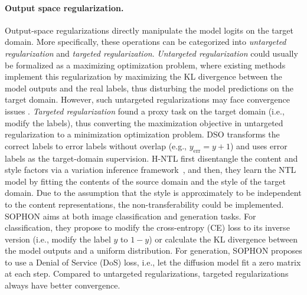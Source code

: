 \paragraph{Output space regularization.} Output-space regularizations directly manipulate the model logits on the target domain. More specifically, these operations can be categorized into \textit{untargeted regularization} and \textit{targeted regularization}. \textit{Untargeted regularization} \cite{wang2021non,wang2023model,zhou2024archlock,peng2024map} could usually be formalized as a maximizing optimization problem, where existing methods implement this regularization by maximizing the KL divergence between the model outputs and the real labels, thus disturbing the model predictions on the target domain. However, such untargeted regularizations may face convergence issues \cite{deng2024sophon}. \textit{Targeted regularization} \cite{wang2023domain,deng2024sophon} found a proxy task on the target domain (i.e., modify the labels), thus converting the maximization objective in untargeted regularization to a minimization optimization problem. 
DSO \cite{wang2023domain} transforms the correct labels to error labels without overlap (e.g., $y_{\text{err}} = y+1$) and uses error labels as the target-domain supervision. 
H-NTL \cite{hong2024improving} first disentangle the content and style factors via a variation inference framework~\cite{blei2017variational,yao2021instance,von2021self,lin2024cs,lin2025learning}, and then, they learn the NTL model by fitting the contents of the source domain and the style of the target domain. Due to the assumption that the style is approximately to be independent to the content representations, the non-transferability could be implemented.
SOPHON \cite{deng2024sophon} aims at both image classification and generation tasks. For classification, they propose to modify the cross-entropy (CE) loss to its inverse version (i.e., modify the label $y$ to $1-y$) or calculate the KL divergence between the model outputs and a uniform distribution. For generation, SOPHON proposes to use a Denial of Service (DoS) loss, i.e., let the diffusion model fit a zero matrix at each step. Compared to untargeted regularizations, targeted regularizations always have better convergence.

